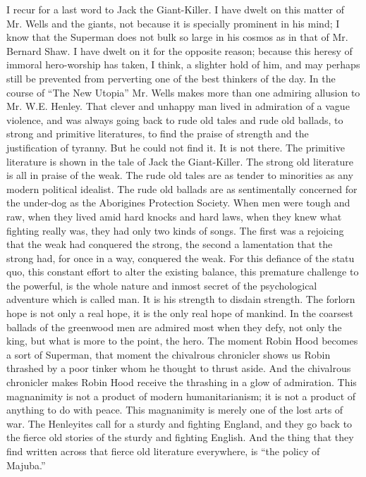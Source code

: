 I recur for a last word to Jack the Giant-Killer. I have dwelt on this matter of Mr. Wells and the giants, not because it is specially prominent in his mind; I know that the Superman does not bulk so large in his cosmos as in that of Mr. Bernard Shaw. I have dwelt on it for the opposite reason; because this heresy of immoral hero-worship has taken, I think, a slighter hold of him, and may perhaps still be prevented from perverting one of the best thinkers of the day. In the course of “The New Utopia” Mr. Wells makes more than one admiring allusion to Mr. W.E. Henley. That clever and unhappy man lived in admiration of a vague violence, and was always going back to rude old tales and rude old ballads, to strong and primitive literatures, to find the praise of strength and the justification of tyranny. But he could not find it. It is not there. The primitive literature is shown in the tale of Jack the Giant-Killer. The strong old literature is all in praise of the weak. The rude old tales are as tender to minorities as any modern political idealist. The rude old ballads are as sentimentally concerned for the under-dog as the Aborigines Protection Society. When men were tough and raw, when they lived amid hard knocks and hard laws, when they knew what fighting really was, they had only two kinds of songs. The first was a rejoicing that the weak had conquered the strong, the second a lamentation that the strong had, for once in a way, conquered the weak. For this defiance of the statu quo, this constant effort to alter the existing balance, this premature challenge to the powerful, is the whole nature and inmost secret of the psychological adventure which is called man. It is his strength to disdain strength. The forlorn hope is not only a real hope, it is the only real hope of mankind. In the coarsest ballads of the greenwood men are admired most when they defy, not only the king, but what is more to the point, the hero. The moment Robin Hood becomes a sort of Superman, that moment the chivalrous chronicler shows us Robin thrashed by a poor tinker whom he thought to thrust aside. And the chivalrous chronicler makes Robin Hood receive the thrashing in a glow of admiration. This magnanimity is not a product of modern humanitarianism; it is not a product of anything to do with peace. This magnanimity is merely one of the lost arts of war. The Henleyites call for a sturdy and fighting England, and they go back to the fierce old stories of the sturdy and fighting English. And the thing that they find written across that fierce old literature everywhere, is “the policy of Majuba.”


